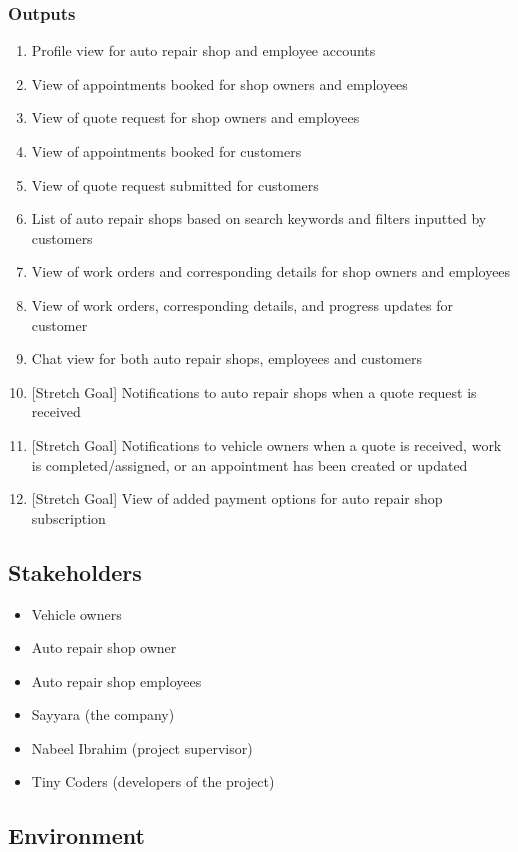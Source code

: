 \documentclass{article}
\begin{document}
\subsubsection{Outputs}
\begin{enumerate}
	\item Profile view for auto repair shop and employee accounts
	\item View of appointments booked for shop owners and employees
	\item View of quote request for shop owners and employees
	\item View of appointments booked for customers
	\item View of quote request submitted for customers
	\item List of auto repair shops based on search keywords and filters inputted by customers
	\item View of work orders and corresponding details for shop owners and employees
	\item View of work orders, corresponding details, and progress updates for customer
	\item Chat view for both auto repair shops, employees and customers
	\item {[Stretch Goal]} Notifications to auto repair shops when a quote request is received
	\item {[Stretch Goal]} Notifications to vehicle owners when a quote is received, work is completed/assigned,
	      or an appointment has been created or updated
	\item {[Stretch Goal]} View of added payment options for auto repair shop subscription
\end{enumerate}

\subsection{Stakeholders}
\begin{itemize}
	\item Vehicle owners
	\item Auto repair shop owner
	\item Auto repair shop employees
	\item Sayyara (the company)
	\item Nabeel Ibrahim (project supervisor)
	\item Tiny Coders (developers of the project)
\end{itemize}

\subsection{Environment}
\end{document}
